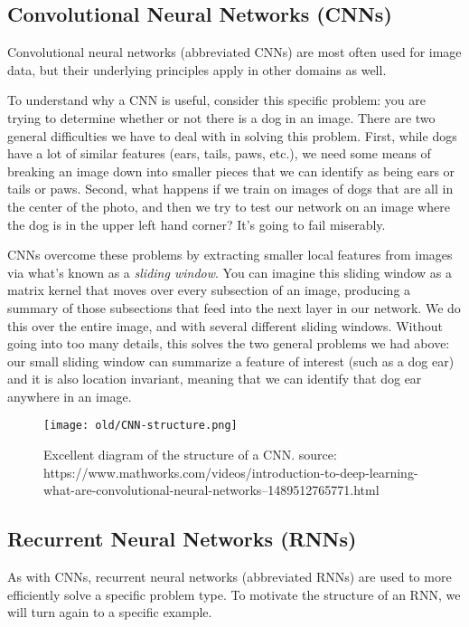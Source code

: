 \subsection{Convolutional Neural Networks (CNNs)}
Convolutional neural networks (abbreviated CNNs) are most often used for image data, but their underlying principles apply in other domains as well.

To understand why a CNN is useful, consider this specific problem: you are trying to determine whether or not there is a dog in an image. There are two general difficulties we have to deal with in solving this problem. First, while dogs have a lot of similar features (ears, tails, paws, etc.), we need some means of breaking an image down into smaller pieces that we can identify as being ears or tails or paws. Second, what happens if we train on images of dogs that are all in the center of the photo, and then we try to test our network on an image where the dog is in the upper left hand corner? It's going to fail miserably.

CNNs overcome these problems by extracting smaller local features from images via what's known as a \textit{sliding window}. You can imagine this sliding window as a matrix kernel that moves over every subsection of an image, producing a summary of those subsections that feed into the next layer in our network. We do this over the entire image, and with several different sliding windows. Without going into too many details, this solves the two general problems we had above: our small sliding window can summarize a feature of interest (such as a dog ear) and it is also location invariant, meaning that we can identify that dog ear anywhere in an image.

\begin{figure}
    \centering
    \texttt{[image: old/CNN-structure.png]}
    \caption{Excellent diagram of the structure of a CNN. source: https://www.mathworks.com/videos/introduction-to-deep-learning-what-are-convolutional-neural-networks--1489512765771.html}
    \label{fig:CNN-structre}
\end{figure}

\subsection{Recurrent Neural Networks (RNNs)}
As with CNNs, recurrent neural networks (abbreviated RNNs) are used to more efficiently solve a specific problem type. To motivate the structure of an RNN, we will turn again to a specific example.

